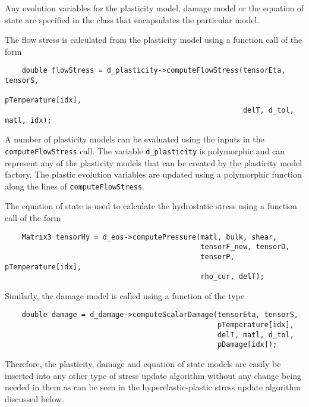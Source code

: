 Any evolution variables for the plasticity model, damage model or the
equation of state are specified in the class that encapsulates the 
particular model.  

The flow stress is calculated from the plasticity model using a 
function call of the form
\lstset{language=C++}
\begin{lstlisting}
    double flowStress = d_plasticity->computeFlowStress(tensorEta, tensorS, 
                                                        pTemperature[idx],
                                                        delT, d_tol, matl, idx);
\end{lstlisting}
A number of plasticity models can be evaluated using the inputs in the
\verb+computeFlowStress+ call.  The variable \verb+d_plasticity+ is
polymorphic and can represent any of the plasticity models that can be
created by the plasticity model factory.  The plastic evolution variables
are updated using a polymorphic function along the lines of
\verb+computeFlowStress+.

The equation of state is used to calculate the hydrostatic stress using
a function call of the form
\lstset{language=C++}
\begin{lstlisting}
    Matrix3 tensorHy = d_eos->computePressure(matl, bulk, shear, 
                                              tensorF_new, tensorD, 
                                              tensorP, pTemperature[idx], 
                                              rho_cur, delT);
\end{lstlisting}

Similarly, the damage model is called using a function of the type
\lstset{language=C++}
\begin{lstlisting}
    double damage = d_damage->computeScalarDamage(tensorEta, tensorS, 
                                                  pTemperature[idx],
                                                  delT, matl, d_tol, 
                                                  pDamage[idx]);
\end{lstlisting}

Therefore, the plasticity, damage and equation of state models are 
easily be inserted into any other type of stress update algorithm 
without any change being needed in them as can be seen in the 
hyperelastic-plastic stress update algorithm discussed below.

